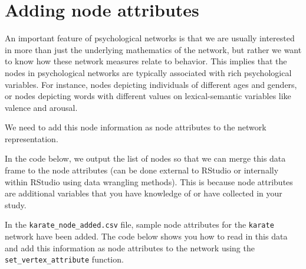 \documentclass[
]{book}
\newenvironment{Shaded}{\begin{snugshade}}{\end{snugshade}}
\newcommand{\AttributeTok}[1]{\textcolor[rgb]{0.13,0.29,0.53}{#1}}
\newcommand{\CommentTok}[1]{\textcolor[rgb]{0.56,0.35,0.01}{\textit{#1}}}
\newcommand{\FunctionTok}[1]{\textcolor[rgb]{0.13,0.29,0.53}{\textbf{#1}}}
\newcommand{\NormalTok}[1]{#1}
\newcommand{\SpecialCharTok}[1]{\textcolor[rgb]{0.81,0.36,0.00}{\textbf{#1}}}
\newcommand{\StringTok}[1]{\textcolor[rgb]{0.31,0.60,0.02}{#1}}
\begin{document}
\section{Adding node attributes}\label{adding-node-attributes}

An important feature of psychological networks is that we are usually interested in more than just the underlying mathematics of the network, but rather we want to know how these network measures relate to behavior. This implies that the nodes in psychological networks are typically associated with rich psychological variables. For instance, nodes depicting individuals of different ages and genders, or nodes depicting words with different values on lexical-semantic variables like valence and arousal.

We need to add this node information as node attributes to the network representation.

In the code below, we output the list of nodes so that we can merge this data frame to the node attributes (can be done external to RStudio or internally within RStudio using data wrangling methods). This is because node attributes are additional variables that you have knowledge of or have collected in your study.

\begin{Shaded}
\end{Shaded}

In the \texttt{karate\_node\_added.csv} file, sample node attributes for the \texttt{karate} network have been added. The code below shows you how to read in this data and add this information as node attributes to the network using the \texttt{set\_vertex\_attribute} function.
\end{document}
